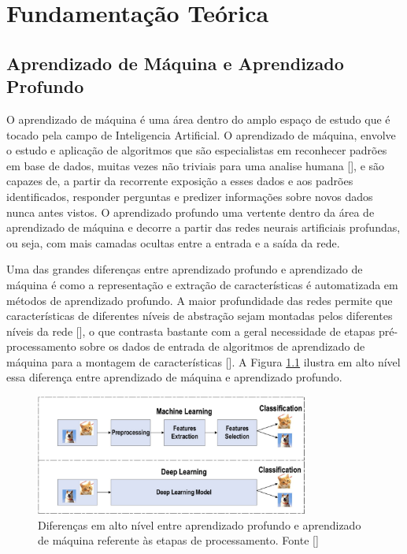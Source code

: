 \chapter{Fundamentação Teórica}


\section{Aprendizado de Máquina e Aprendizado Profundo}
O aprendizado de máquina é uma área dentro do amplo espaço de estudo que é tocado pela campo de Inteligencia Artificial. O aprendizado de máquina, envolve o estudo e aplicação de algoritmos que são especialistas em reconhecer padrões em base de dados, muitas vezes não triviais para uma analise humana [], e são capazes de, a partir da recorrente exposição a esses dados e aos padrões identificados, responder perguntas e predizer informações sobre novos dados nunca antes vistos. O aprendizado profundo uma vertente dentro da área de aprendizado de máquina e decorre a partir das redes neurais artificiais profundas, ou seja, com mais camadas ocultas entre a entrada e a saída da rede.

Uma das grandes diferenças entre aprendizado profundo e aprendizado de máquina é como a representação e extração de características é automatizada em métodos de aprendizado profundo. A maior profundidade das redes permite que características de diferentes níveis de abstração sejam montadas pelos diferentes níveis da rede [], o que contrasta bastante com a geral necessidade de etapas pré-processamento sobre os dados de entrada de algoritmos de aprendizado de máquina para a montagem de características []. A Figura \ref{fig:dl_vs_ml} ilustra em alto nível essa diferença entre aprendizado de máquina e aprendizado profundo.

\begin{figure}
    \centering
    \includegraphics[width=0.8\textwidth]{figs/theory-ml-vs-dl.png}
    \caption{Diferenças em alto nível entre aprendizado profundo e aprendizado de máquina referente às etapas de processamento. Fonte []}
    \label{fig:dl_vs_ml}
\end{figure}

